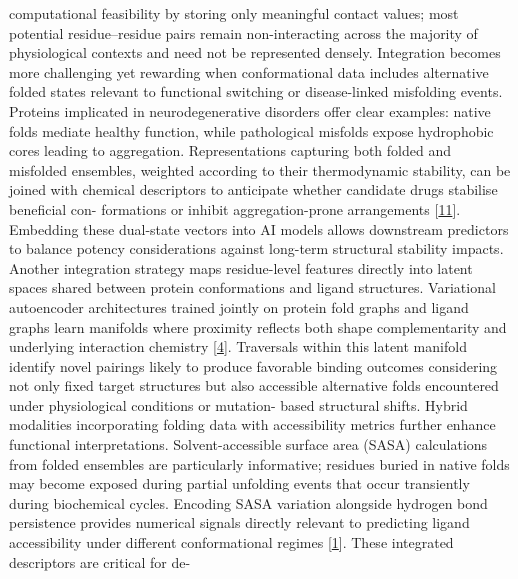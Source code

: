 \documentclass[
]{article}
\begin{document}
computational feasibility by storing only meaningful contact values;
most potential residue--residue pairs remain non-interacting across the
majority of physiological contexts and need not be represented densely.
Integration becomes more challenging yet rewarding when conformational
data includes alternative folded states relevant to functional switching
or disease-linked misfolding events. Proteins implicated in
neurodegenerative disorders offer clear examples: native folds mediate
healthy function, while pathological misfolds expose hydrophobic cores
leading to aggregation. Representations capturing both folded and
misfolded ensembles, weighted according to their thermodynamic
stability, can be joined with chemical descriptors to anticipate whether
candidate drugs stabilise beneficial con- formations or inhibit
aggregation-prone arrangements {[}\hyperref[_bookmark51]{11}{]}.
Embedding these dual-state vectors into AI models allows downstream
predictors to balance potency considerations against long-term
structural stability impacts. Another integration strategy maps
residue-level features directly into latent spaces shared between
protein conformations and ligand structures. Variational autoencoder
architectures trained jointly on protein fold graphs and ligand graphs
learn manifolds where proximity reflects both shape complementarity and
underlying interaction chemistry {[}\hyperref[_bookmark44]{4}{]}.
Traversals within this latent manifold identify novel pairings likely to
produce favorable binding outcomes considering not only fixed target
structures but also accessible alternative folds encountered under
physiological conditions or mutation- based structural shifts. Hybrid
modalities incorporating folding data with accessibility metrics further
enhance functional interpretations. Solvent-accessible surface area
(SASA) calculations from folded ensembles are particularly informative;
residues buried in native folds may become exposed during partial
unfolding events that occur transiently during biochemical cycles.
Encoding SASA variation alongside hydrogen bond persistence provides
numerical signals directly relevant to predicting ligand accessibility
under different conformational regimes {[}\hyperref[_bookmark41]{1}{]}.
These integrated descriptors are critical for de-
\end{document}
